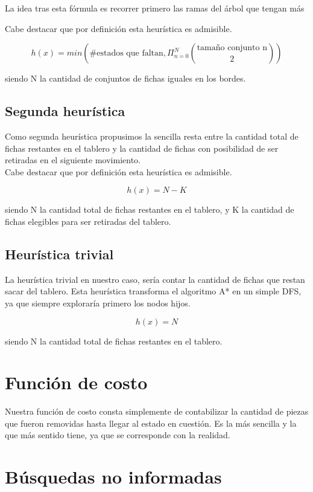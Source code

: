 \documentclass[a4paper,10pt]{article}
\begin{document}
    La idea tras esta fórmula es recorrer primero las ramas del árbol que tengan más 

    Cabe destacar que por definición esta heurística es admisible.


    \[ h(x) = min(\text{\# estados que faltan}, \Pi_{n=0}^{N} { \text{tamaño conjunto n} \choose 2} )\] 

    siendo N la cantidad de conjuntos de fichas iguales en los bordes.
    
    \subsection{Segunda heurística}

    Como segunda heurística propusimos la sencilla resta entre la cantidad total de fichas restantes en el tablero y la cantidad de fichas con posibilidad de ser retiradas en el
    siguiente movimiento.\\

    Cabe destacar que por definición esta heurística es admisible.

     \[ h(x) = N - K\] 

    siendo N la cantidad total de fichas restantes en el tablero, y K la cantidad de fichas elegibles para ser retiradas del tablero.

    \subsection{Heurística trivial}

    La heurística trivial en nuestro caso, sería contar la cantidad de fichas que restan sacar del tablero. Esta heurística transforma el algoritmo A* en un simple DFS, ya que siempre 
    exploraría primero los nodos hijos.

    \[ h(x) = N \] 

    siendo N la cantidad total de fichas restantes en el tablero.

\section{Función de costo}

    Nuestra función de costo consta simplemente de contabilizar la cantidad de piezas que fueron removidas hasta llegar al estado en cuestión. Es la más sencilla y la que más sentido
    tiene, ya que se corresponde con la realidad. \\

\section{Búsquedas no informadas}
\end{document}
